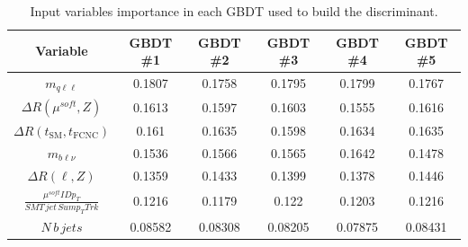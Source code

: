 \begin{table}[!htbp]
	\small
	\centering
	\begin{tabular}{cccccc}
		\toprule
		Variable & GBDT \#1 & GBDT \#2 & GBDT \#3 & GBDT \#4 & GBDT \#5 \\
		\midrule
		$m_{q\ell\ell}$  &  0.1807  &  0.1758  &  0.1795  &  0.1799  &  0.1767  \\ 
		$\Delta R(\mu^{soft},Z)$  &  0.1613  &  0.1597  &  0.1603  &  0.1555  &  0.1616  \\ 
		$\Delta R(t_{\text{SM}},t_{\text{FCNC}})$  &  0.161  &  0.1635  &  0.1598  &  0.1634  &  0.1635  \\ 
		$m_{b\ell\nu}$  &  0.1536  &  0.1566  &  0.1565  &  0.1642  &  0.1478  \\ 
		$\Delta R(\ell,Z)$  &  0.1359  &  0.1433  &  0.1399  &  0.1378  &  0.1446  \\ 
		$\frac{\mu^{soft} ID p_{T}}{SMT\,jet\,Sum p_{T} Trk}$  &  0.1216  &  0.1179  &  0.122  &  0.1203  &  0.1216  \\ 
		$N\,b\,jets$  &  0.08582  &  0.08308  &  0.08205  &  0.07875  &  0.08431  \\ 
		\bottomrule
	\end{tabular}
	\caption{
	Input variables importance in each GBDT used to build the \Dthree discriminant.
}%
\label{tab:D3importance}
\end{table}

